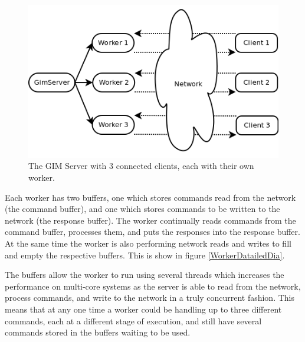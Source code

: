 \begin{figure}
    \begin{center}
        \includegraphics[scale=0.6]{Design/diagrams/server_workers.png}
        \caption{The GIM Server with 3 connected clients, each with their own worker.}
        \label{WorkersDia}
    \end{center}
\end{figure}

Each worker has two buffers, one which stores commands read from the network (the command buffer), and one which stores commands to be written to the network (the response buffer). The worker continually reads commands from the command buffer, processes them, and puts the responses into the response buffer. At the same time the worker is also performing network reads and writes to fill and empty the respective buffers. This is show in figure \ref{WorkerDatailedDia}.

The buffers allow the worker to run using several threads which increases the performance on multi-core systems as the server is able to read from the network, process commands, and write to the network in a truly concurrent fashion. This means that at any one time a worker could be handling up to three different commands, each at a different stage of execution, and still have several commands stored in the buffers waiting to be used.


